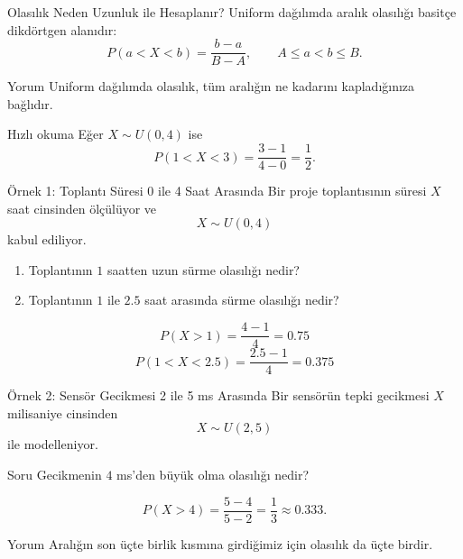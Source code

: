 \documentclass[light]{lutbeamer}
\begin{document}
\begin{frame}{Olasılık Neden Uzunluk ile Hesaplanır?}
    \small
    Uniform dağılımda aralık olasılığı basitçe dikdörtgen alanıdır:
    \[
    P(a<X<b)=\frac{b-a}{B-A}, \qquad A\le a<b \le B.
    \]

    \begin{block}{Yorum}
        Uniform dağılımda olasılık, tüm aralığın ne kadarını kapladığınıza bağlıdır.
    \end{block}

    \begin{exampleblock}{Hızlı okuma}
        Eğer \(X \sim U(0,4)\) ise
        \[
        P(1<X<3)=\frac{3-1}{4-0}=\frac{1}{2}.
        \]
    \end{exampleblock}
\end{frame}

\begin{frame}{Örnek 1: Toplantı Süresi 0 ile 4 Saat Arasında}
    \small
    Bir proje toplantısının süresi \(X\) saat cinsinden ölçülüyor ve
    \[
    X \sim U(0,4)
    \]
    kabul ediliyor.

    \begin{enumerate}
        \item Toplantının \(1\) saatten uzun sürme olasılığı nedir?
        \item Toplantının \(1\) ile \(2.5\) saat arasında sürme olasılığı nedir?
    \end{enumerate}

    \[
    P(X>1)=\frac{4-1}{4}=0.75
    \]
    \[
    P(1<X<2.5)=\frac{2.5-1}{4}=0.375
    \]
\end{frame}

\begin{frame}{Örnek 2: Sensör Gecikmesi 2 ile 5 ms Arasında}
    \small
    Bir sensörün tepki gecikmesi \(X\) milisaniye cinsinden
    \[
    X \sim U(2,5)
    \]
    ile modelleniyor.

    \begin{block}{Soru}
        Gecikmenin \(4\) ms'den büyük olma olasılığı nedir?
    \end{block}

    \[
    P(X>4)=\frac{5-4}{5-2}=\frac{1}{3}\approx 0.333.
    \]

    \begin{alertblock}{Yorum}
        Aralığın son üçte birlik kısmına girdiğimiz için olasılık da üçte birdir.
    \end{alertblock}
\end{frame}
\end{document}
